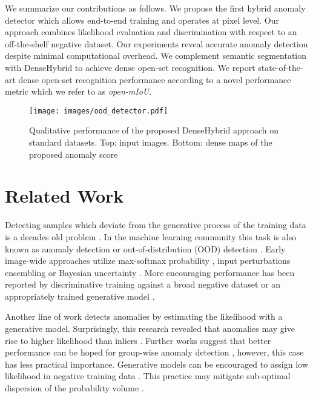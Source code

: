\documentclass[runningheads]{llncs}
\begin{document}
We summarize our contributions as follows.
We propose the first hybrid anomaly detector which allows end-to-end training and operates at pixel level.
Our approach combines likelihood evaluation and discrimination with respect to an off-the-shelf negative dataset.
Our experiments reveal accurate anomaly detection despite minimal computational overhead.
We complement semantic segmentation with DenseHybrid to achieve dense open-set recognition.
We report state-of-the-art dense open-set recognition performance according to a novel performance metric which we refer to as \textit{open-mIoU}.

\begin{figure}
    \centering
    \texttt{[image: images/ood\_detector.pdf]}
    \caption{Qualitative performance of the proposed DenseHybrid approach on standard datasets. Top: input images. Bottom: dense maps of the proposed anomaly score}
    \label{fig:ood_detector}
\end{figure}

\section{Related Work}

Detecting samples which deviate from the generative process of the training data is a decades old problem \cite{hawkins80book}.
In the machine learning community this task is also known as anomaly detection or out-of-distribution (OOD) detection \cite{hendrycks17iclr}.
Early image-wide approaches
utilize max-softmax probability \cite{hendrycks17iclr}, input perturbations \cite{liang18iclr} ensembling \cite{lakshminarayanan17nips} or Bayesian uncertainty \cite{mukhoti18arxiv}.
More encouraging performance has been reported
by discriminative training against a broad negative dataset \cite{dhamija18nips,hendrycks19iclr,bevandic19gcpr,liu20neurips} or an appropriately trained generative model \cite{lee18iclr,grcic21visapp,zhao21arxiv}.


Another line of work detects anomalies by estimating the likelihood with a generative model.
Surprisingly, this research revealed that anomalies may give rise to higher likelihood than inliers \cite{nalisnick19iclr,serra20iclr,zhang21icml}.
Further works suggest that better performance
can be hoped for group-wise anomaly detection \cite{jiang22iclr}, however, this case has less practical importance.
Generative models can be encouraged to assign low likelihood in negative training data \cite{hendrycks19iclr}.
This practice may mitigate sub-optimal dispersion of the probability volume \cite{lucas19nips}.
\end{document}
